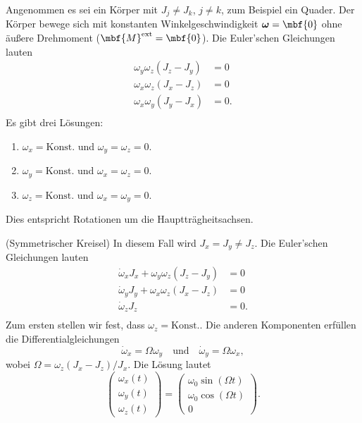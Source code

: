 \begin{beispiel}
  Angenommen es sei ein Körper mit $J_j\not=J_k$, $j\not=k$, zum Beispiel ein Quader. Der Körper bewege sich mit konstanten Winkelgeschwindigkeit $\boldsymbol{\omega}=\mbf{0}$ ohne äußere Drehmoment ($\mbf{M}^{\text{ext}}=\mbf{0}$). Die Euler'schen Gleichungen lauten 
  \begin{equation}
    \begin{split}
    \omega_y\omega_z(J_z-J_y) &= 0 \\
    \omega_x\omega_z(J_x-J_z) &= 0 \\
    \omega_x\omega_y(J_y-J_x) &= 0. \\
  \end{split}
  \end{equation}
  Es gibt drei Lösungen:
  \begin{enumerate}
    \item $\omega_x = \text{Konst.}$ und $\omega_y=\omega_z  = 0$.
    \item $\omega_y = \text{Konst.}$ und $\omega_x=\omega_z  = 0$.
    \item $\omega_z = \text{Konst.}$ und $\omega_x=\omega_y  = 0$.
  \end{enumerate}
  Dies entspricht Rotationen um die Hauptträgheitsachsen.
\end{beispiel}

\begin{beispiel}(Symmetrischer Kreisel)
  In diesem Fall wird $J_x = J_y \not= J_z$. Die Euler'schen Gleichungen lauten
  \begin{equation}
    \begin{split}
    \dot{\omega}_x J_x + \omega_y\omega_z(J_z-J_y) &= 0 \\
    \dot{\omega}_y J_y + \omega_x\omega_z(J_x-J_z) &= 0 \\
    \dot{\omega}_z J_z  &= 0. \\
  \end{split}
  \end{equation}
  Zum ersten stellen wir fest, dass $\omega_z = \text{Konst.}$. Die anderen Komponenten erfüllen die Differentialgleichungen
  \begin{equation}
    \dot{\omega}_x = \Omega \omega_y\quad\text{und}\quad \dot{\omega}_y = \Omega \omega_x,
  \end{equation}
  wobei $\Omega = \omega_z(J_x-J_z)/J_x$. Die Lösung lautet
  \begin{equation}
    \begin{pmatrix}
      \omega_x(t) \\
      \omega_y(t) \\
      \omega_z(t) 
    \end{pmatrix}
    =
    \begin{pmatrix}
      \omega_0 \sin(\Omega t) \\
      \omega_0 \cos(\Omega t) \\
      0
    \end{pmatrix}.
  \end{equation}
\end{beispiel}